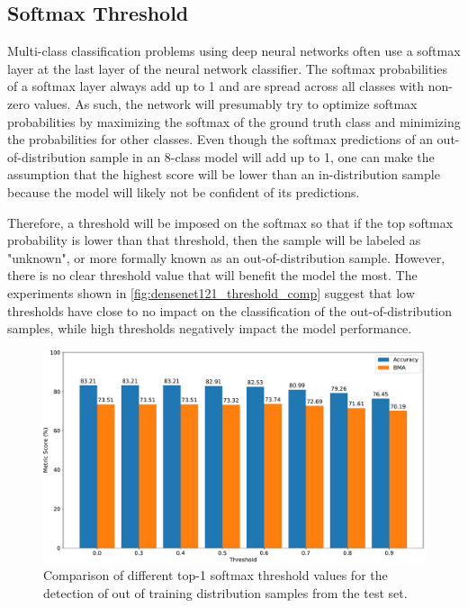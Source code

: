     \subsection{Softmax Threshold}
        Multi-class classification problems using deep neural networks often use a softmax layer at the last layer of the neural network classifier. The softmax probabilities of a softmax layer always add up to 1 and are spread across all classes with non-zero values. As such, the network will presumably try to optimize softmax probabilities by maximizing the softmax of the ground truth class and minimizing the probabilities for other classes. Even though the softmax predictions of an out-of-distribution sample in an 8-class model will add up to 1, one can make the assumption that the highest score will be lower than an in-distribution sample because the model will likely not be confident of its predictions. \par
        
        Therefore, a threshold will be imposed on the softmax so that if the top softmax probability is lower than that threshold, then the sample will be labeled as "unknown", or more formally known as an out-of-distribution sample. However, there is no clear threshold value that will benefit the model the most. The experiments shown in \autoref{fig:densenet121_threshold_comp} suggest that low thresholds have close to no impact on the classification of the out-of-distribution samples, while high thresholds negatively impact the model performance. 
        \begin{figure}[ht]
            \centering
            \includegraphics[width=\textwidth]{figs/densenet121_threshold_comp.pdf}
            \caption{Comparison of different top-1 softmax threshold values for the detection of out of training distribution samples from the test set.}
            \label{fig:densenet121_threshold_comp}
        \end{figure}
        

